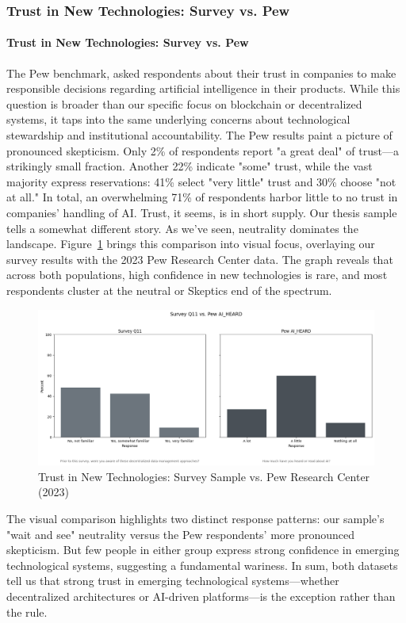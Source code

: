 	\subsubsection{Trust in New Technologies: Survey vs. Pew}

	\paragraph{Trust in New Technologies: Survey vs. Pew}
	The Pew benchmark, asked respondents about their trust in companies to make responsible decisions regarding artificial intelligence in their products. While this question is broader than our specific focus on blockchain or decentralized systems, it taps into the same underlying concerns about technological stewardship and institutional accountability. The Pew results paint a picture of pronounced skepticism. Only 2\% of respondents report "a great deal" of trust—a strikingly small fraction. Another 22\% indicate "some" trust, while the vast majority express reservations: 41\% select "very little" trust and 30\% choose "not at all." In total, an overwhelming 71\% of respondents harbor little to no trust in companies' handling of AI. Trust, it seems, is in short supply.
	Our thesis sample tells a somewhat different story. As we've seen, neutrality dominates the landscape.
	Figure~\ref{fig:trust_newtech_Pew} brings this comparison into visual focus, overlaying our survey results with the 2023 Pew Research Center data. The graph reveals that across both populations, high confidence in new technologies is rare, and most respondents cluster at the neutral or Skeptics end of the spectrum.
	\begin{figure}[ht]\centering
		\includegraphics[width=1\linewidth]{figures/img/Pew_comparison_plots/compare_11_vs_AI_HEARD.png}
		\caption{Trust in New Technologies: Survey Sample vs. Pew Research Center (2023)}
		\label{fig:trust_newtech_Pew}
	\end{figure}
	The visual comparison highlights two distinct response patterns: our sample's "wait and see" neutrality versus the Pew respondents' more pronounced skepticism. But few people in either group express strong confidence in emerging technological systems, suggesting a fundamental wariness. 			
	In sum, both datasets tell us that strong trust in emerging technological systems—whether decentralized architectures or AI-driven platforms—is the exception rather than the rule.
